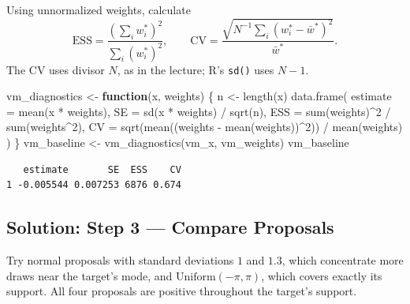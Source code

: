 \documentclass[
  letterpaper,
  DIV=11,
  numbers=noendperiod]{scrartcl}
\newenvironment{Shaded}{\begin{snugshade}}{\end{snugshade}}
\newcommand{\AttributeTok}[1]{\textcolor[rgb]{0.40,0.45,0.13}{#1}}
\newcommand{\ControlFlowTok}[1]{\textcolor[rgb]{0.00,0.23,0.31}{\textbf{#1}}}
\newcommand{\DecValTok}[1]{\textcolor[rgb]{0.68,0.00,0.00}{#1}}
\newcommand{\FunctionTok}[1]{\textcolor[rgb]{0.28,0.35,0.67}{#1}}
\newcommand{\NormalTok}[1]{\textcolor[rgb]{0.00,0.23,0.31}{#1}}
\newcommand{\OtherTok}[1]{\textcolor[rgb]{0.00,0.23,0.31}{#1}}
\newcommand{\SpecialCharTok}[1]{\textcolor[rgb]{0.37,0.37,0.37}{#1}}
\begin{document}
Using unnormalized weights, calculate \[
  \mathrm{ESS} = \frac{(\sum_i w_i^*)^2}{\sum_i (w_i^*)^2},
  \qquad
  \mathrm{CV} = \frac{\sqrt{N^{-1}\sum_i(w_i^*-\bar w^*)^2}}{\bar w^*}.
\] The CV uses divisor \(N\), as in the lecture; R's \texttt{sd()} uses
\(N-1\).

\begin{Shaded}
\begin{Highlighting}[]
\NormalTok{vm\_diagnostics }\OtherTok{\textless{}{-}} \ControlFlowTok{function}\NormalTok{(x, weights) \{}
\NormalTok{  n }\OtherTok{\textless{}{-}} \FunctionTok{length}\NormalTok{(x)}
  \FunctionTok{data.frame}\NormalTok{(}
    \AttributeTok{estimate =} \FunctionTok{mean}\NormalTok{(x }\SpecialCharTok{*}\NormalTok{ weights),}
    \AttributeTok{SE =} \FunctionTok{sd}\NormalTok{(x }\SpecialCharTok{*}\NormalTok{ weights) }\SpecialCharTok{/} \FunctionTok{sqrt}\NormalTok{(n),}
    \AttributeTok{ESS =} \FunctionTok{sum}\NormalTok{(weights)}\SpecialCharTok{\^{}}\DecValTok{2} \SpecialCharTok{/} \FunctionTok{sum}\NormalTok{(weights}\SpecialCharTok{\^{}}\DecValTok{2}\NormalTok{),}
    \AttributeTok{CV =} \FunctionTok{sqrt}\NormalTok{(}\FunctionTok{mean}\NormalTok{((weights }\SpecialCharTok{{-}} \FunctionTok{mean}\NormalTok{(weights))}\SpecialCharTok{\^{}}\DecValTok{2}\NormalTok{)) }\SpecialCharTok{/} \FunctionTok{mean}\NormalTok{(weights)}
\NormalTok{  )}
\NormalTok{\}}
\NormalTok{vm\_baseline }\OtherTok{\textless{}{-}} \FunctionTok{vm\_diagnostics}\NormalTok{(vm\_x, vm\_weights)}
\NormalTok{vm\_baseline}
\end{Highlighting}
\end{Shaded}

\begin{verbatim}
   estimate       SE  ESS    CV
1 -0.005544 0.007253 6876 0.674
\end{verbatim}

\subsection{Solution: Step 3 --- Compare
Proposals}\label{solution-step-3-compare-proposals}

Try normal proposals with standard deviations \(1\) and \(1.3\), which
concentrate more draws near the target's mode, and
\(\mathrm{Uniform}(-\pi,\pi)\), which covers exactly its support. All
four proposals are positive throughout the target's support.
\end{document}

